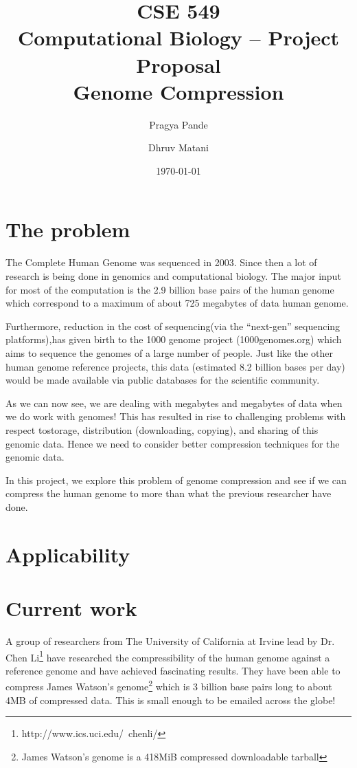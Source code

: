 \documentclass[11pt,twocolumn]{article}
\begin{document}
\title{CSE 549\\Computational Biology -- Project Proposal\\Genome Compression}
\author{Pragya Pande \and Dhruv Matani}
\date{\today}

\maketitle

\vspace{0.5in}

\section*{The problem}
The Complete Human Genome was sequenced in 2003. Since then a lot of
research is being done in genomics and computational biology. The
major input for most of the computation is the 2.9 billion base pairs
\cite{2}\cite{3} of the human genome which correspond to a maximum of about 
725 megabytes of data human genome.\cite{4}

Furthermore, reduction in the cost of sequencing(via the “next-gen” 
sequencing platforms),has given birth to the 1000 genome project
(1000genomes.org) which aims to sequence the genomes of a large 
number of people. Just like the other human genome reference projects,
this data (estimated 8.2 billion bases per day) would be made
available via public databases for the scientific community.\cite{5}

As we can now see, we are dealing with megabytes and megabytes of data 
when we do work with genomes! This has resulted in rise to challenging 
problems with respect tostorage, distribution (downloading, copying), 
and sharing of this genomic data. Hence we need to consider better 
compression techniques for the genomic data.

In this project, we explore this problem of genome compression and see
if we can compress the human genome to more than what the previous
researcher have done.\cite{6}

\section*{Applicability}


\section*{Current work}

A group of researchers from The University of California at Irvine
lead by Dr. Chen Li\footnote{http://www.ics.uci.edu/~chenli/} have
researched the compressibility of the human genome against a reference
genome and have achieved fascinating results. They have been able to
compress James Watson's genome\footnote{James Watson's genome is a
  418MiB compressed downloadable tarball} which is 3 billion base
pairs long to about 4MB of compressed data. This is small enough to be
emailed across the globe!\cite{xyz}
\end{document}
